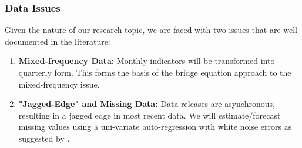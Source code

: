 \begin{frame}
    \frametitle{Data Issues}
    Given the nature of our research topic, we are faced with two issues that are well documented in the literature:
    \begin{enumerate}
        \item \textbf{Mixed-frequency Data:} Monthly indicators will be transformed into quarterly form. This forms the basis of the bridge equation approach to the mixed-frequency issue.
        \item \textbf{"Jagged-Edge" and Missing Data:}  Data releases are asynchronous, resulting in a jagged edge in most recent data. We will estimate/forecast missing values using a uni-variate auto-regression with white noise errors as suggested by \textcite{castle_forecasting_2017}.
    \end{enumerate}

\end{frame}